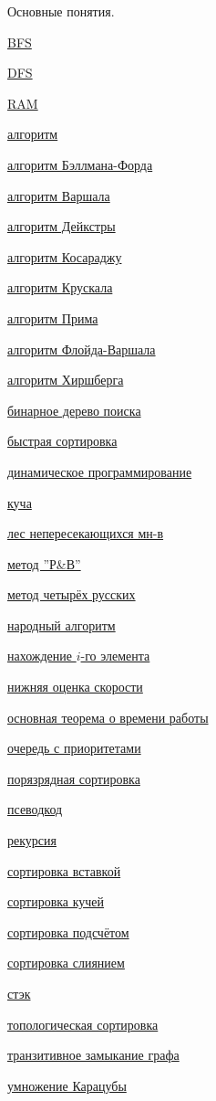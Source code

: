 \documentclass[a4paper]{article}
\theoremstyle{indented}
\theoremstyle{definition}
\theoremstyle{remark}
\begin{document}
\hypertarget{uk}{Основные понятия.}

\begin{multicols}{2}

\hyperlink{t10}{BFS} \ 

\hyperlink{t11}{DFS} \ 

\hyperlink{d-2}{RAM} \    

\hyperlink{d-1}{алгоритм} \

\hyperlink{t14}{алгоритм Бэллмана-Форда} \ 

\hyperlink{t23}{алгоритм Варшала} \ 

\hyperlink{t15}{алгоритм Дейкстры} \ 

\hyperlink{t13}{алгоритм Косараджу} \ 

\hyperlink{t19}{алгоритм Крускала} \ 

\hyperlink{t18}{алгоритм Прима} \ 

\hyperlink{t24}{алгоритм Флойда-Варшала} \ 

\hyperlink{t9}{алгоритм Хиршберга} \ 

\hyperlink{t27}{бинарное дерево поиска} \ 

\hyperlink{r1}{быстрая сортировка} \ 

\hyperlink{e1}{динамическое программирование} \ 

\hyperlink{d1.5}{куча} \ 

\hyperlink{t20}{лес непересекающихся мн-в} \ 

\hyperlink{t-2}{метод ''Р&В''} \ 

\hyperlink{t26}{метод четырёх русских} \ 

\hyperlink{t8}{народный алгоритм} \ 

\hyperlink{t5}{нахождение $i$-го элемента} \ 

\hyperlink{t2.5}{нижняя оценка скорости} \ 

\hyperlink{t25}{основная теорема о времени работы} \ 

\hyperlink{d3}{очередь с приоритетами} \ 

\hyperlink{t4}{порязрядная сортировка} \ 

\hyperlink{d-2}{псеводкод} \  

\hyperlink{d-3}{рекурсия} \ 

\hyperlink{t-3}{сортировка вставкой} \ 

\hyperlink{t2}{сортировка кучей} \ 

\hyperlink{t3}{сортировка подсчётом} \ 

\hyperlink{t-4}{сортировка слиянием} \ 

\hyperlink{d-4}{стэк} \ 

\hyperlink{t12}{топологическая сортировка} \ 

\hyperlink{d10}{транзитивное замыкание графа} \ 

\hyperlink{t-1}{умножение Карацубы} \ 



\end{multicols}
\end{document}
